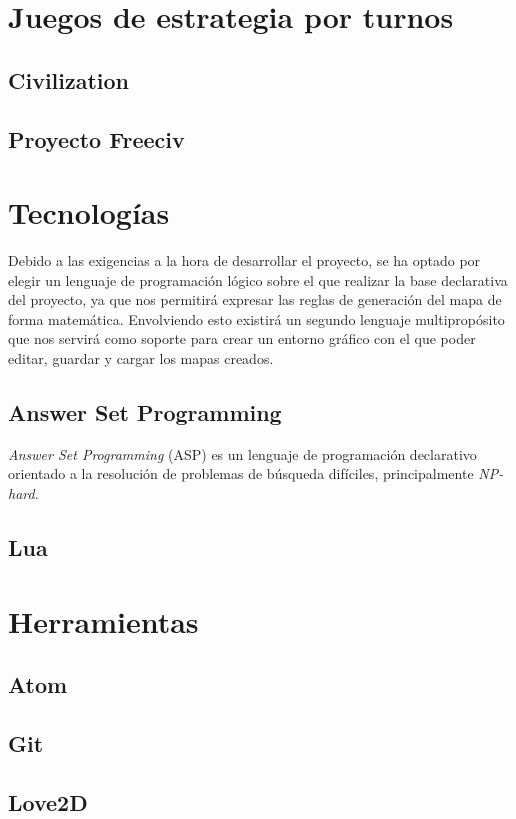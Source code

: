 \section{Juegos de estrategia por turnos}

\subsection{Civilization}

\subsection{Proyecto Freeciv}

\section{Tecnologías}

Debido a las exigencias a la hora de desarrollar el proyecto, se ha optado por elegir un lenguaje de programación lógico sobre el que realizar la base declarativa del proyecto, ya que nos permitirá expresar las reglas de generación del mapa de forma matemática. Envolviendo esto existirá un segundo lenguaje multipropósito que nos servirá como soporte para crear un entorno gráfico con el que poder editar, guardar y cargar los mapas creados.

\subsection{Answer Set Programming}

\textit{Answer Set Programming} (ASP) es un lenguaje de programación declarativo orientado a la resolución de problemas de búsqueda difíciles, principalmente \textit{NP-hard}.

\subsection{Lua}

\section{Herramientas}

\subsection{Atom}

\subsection{Git}

\subsection{Love2D}